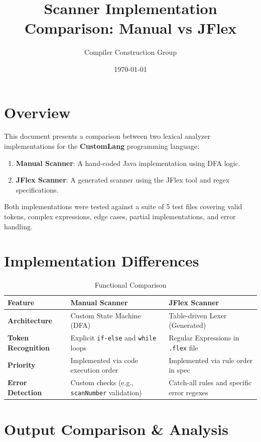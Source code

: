 \documentclass[12pt]{article}
\title{Scanner Implementation Comparison: Manual vs JFlex}
\author{Compiler Construction Group}
\date{\today}
\begin{document}
\maketitle

\section{Overview}
This document presents a comparison between two lexical analyzer implementations for the \textbf{CustomLang} programming language:
\begin{enumerate}
    \item \textbf{Manual Scanner}: A hand-coded Java implementation using DFA logic.
    \item \textbf{JFlex Scanner}: A generated scanner using the JFlex tool and regex specifications.
\end{enumerate}

Both implementations were tested against a suite of 5 test files covering valid tokens, complex expressions, edge cases, partial implementations, and error handling.

\section{Implementation Differences}

\begin{table}[H]
    \centering
    \begin{tabular}{|p{4cm}|p{5cm}|p{5cm}|}
        \hline
        \textbf{Feature} & \textbf{Manual Scanner} & \textbf{JFlex Scanner} \\
        \hline
        \textbf{Architecture} & Custom State Machine (DFA) & Table-driven Lexer (Generated) \\
        \hline
        \textbf{Token Recognition} & Explicit \texttt{if-else} and \texttt{while} loops & Regular Expressions in \texttt{.flex} file \\
        \hline
        \textbf{Priority} & Implemented via code execution order & Implemented via rule order in spec \\
        \hline
        \textbf{Error Detection} & Custom checks (e.g., \texttt{scanNumber} validation) & Catch-all rules and specific error regexes \\
        \hline
    \end{tabular}
    \caption{Functional Comparison}
\end{table}

\section{Output Comparison \& Analysis}
\end{document}
